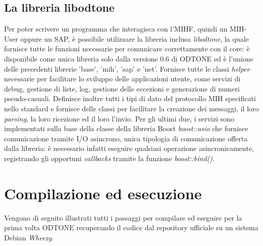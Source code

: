 \subsection{La libreria libodtone}
Per poter scrivere un programma che interagisca con l'MIHF, quindi un MIH-User oppure un SAP, è possibile utilizzare la libreria inclusa {\em libodtone}, la quale fornisce tutte le funzioni necessarie per comunicare correttamente con il core: è disponibile come unica libreria solo dalla versione 0.6 di ODTONE ed è l'unione delle precedenti librerie 'base', 'mih', 'sap' e 'net'\cite{changelog}. Fornisce tutte le classi {\em helper} necessarie per facilitare lo sviluppo delle applicazioni utente, come servizi di debug, gestione di liste, log, gestione delle eccezioni e generazione di numeri pseudo-casuali. Definisce inoltre tutti i tipi di dato del protocollo MIH specificati nello standard e fornisce delle classi per facilitare la creazione dei messaggi, il loro {\em parsing}, la loro ricezione ed il loro l'invio. Per gli ultimi due, i servizi sono implementati sulla base della classe della libreria Boost {\em boost::asio} che fornisce comunicazione tramite I/O asincrono, unica tipologia di comunicazione offerta dalla libreria: è necessario infatti eseguire qualsiasi operazione asincronicamente, registrando gli opportuni {\em callbacks} tramite la funzione {\em boost::bind()}.

\section{Compilazione ed esecuzione}
Vengono di seguito illustrati tutti i passaggi per compilare ed eseguire per la prima volta ODTONE recuperando il codice dal repository ufficiale su un sistema Debian\cite{debian} {\em Wheezy}.

